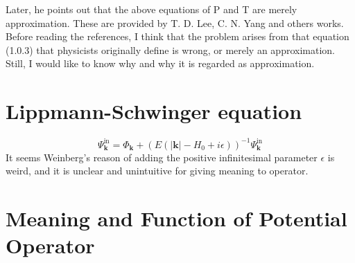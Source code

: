 \documentclass[12pt]{article}
\numberwithin{equation}{subsection}
\begin{document}
Later, he points out that the above equations of P and T are merely approximation.
These are provided by T. D. Lee, C. N. Yang and others works\cite{PhysRev.104.254}\cite{PhysRevLett.13.138}. 
Before reading the references, I think that the problem arises from that equation (1.0.3) that physicists originally define is wrong, or merely an approximation.
Still, I would like to know why and why it is regarded as approximation.
\section{Lippmann-Schwinger equation}
\begin{equation}
    \Psi_{\mathbf{k}}^{\text{in}} = \Phi_{\mathbf{k}}+\left(E(|\mathbf{k}|-H_{0}+i\epsilon)\right)^{-1}\Psi_{\mathbf{k}}^{\text{in}}
\end{equation}
It seems Weinberg's reason of adding the positive infinitesimal parameter $\epsilon$ is weird, and it is unclear and unintuitive for giving meaning to operator.
\section{Meaning and Function of Potential Operator}



\end{document}
